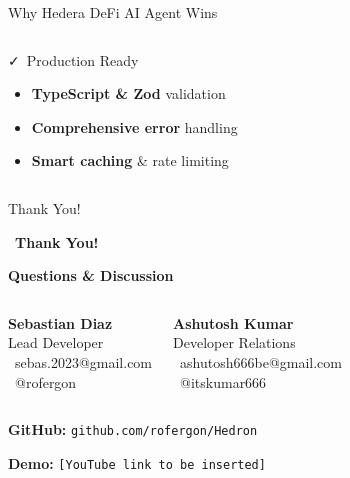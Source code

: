 \documentclass[aspectratio=169]{beamer}
\providecommand{\faCheckDouble}{\faCheck}
\begin{document}
\begin{frame}{Why Hedera DeFi AI Agent Wins}
\begin{columns}
\begin{block}{\faCheckDouble\ Production Ready}
\begin{itemize}
\item \textbf{TypeScript \& Zod} validation
\item \textbf{Comprehensive error} handling
\item \textbf{Smart caching} \& rate limiting
\end{itemize}
\end{block}
\end{columns}
\end{frame}

\begin{frame}{Thank You!}
\begin{center}
\large \faHeart\ \textbf{Thank You!}

\vspace{0.2cm}

\small \textbf{Questions \& Discussion}

\vspace{0.3cm}

\begin{columns}
\hspace{2.5cm}
\textbf{\footnotesize Sebastian Diaz}\\
\vspace{0.05cm}
\footnotesize Lead Developer\\
\vspace{0.05cm}
\footnotesize \faEnvelope\ sebas.2023@gmail.com\\
\footnotesize \faGithub\ @rofergon

\textbf{\footnotesize Ashutosh Kumar}\\
\vspace{0.05cm}
\footnotesize Developer Relations\\
\vspace{0.05cm}
\footnotesize \faEnvelope\ ashutosh666be@gmail.com
\\
\footnotesize \faGithub\ @itskumar666
\end{columns}

\vspace{0.3cm}

\textbf{\footnotesize GitHub:} \hspace{0.2cm} \texttt{\footnotesize github.com/rofergon/Hedron}

\vspace{0.1cm}

\textbf{\footnotesize Demo:} \texttt{\footnotesize [YouTube link to be inserted]}
\end{center}
\end{frame}
\end{document}
